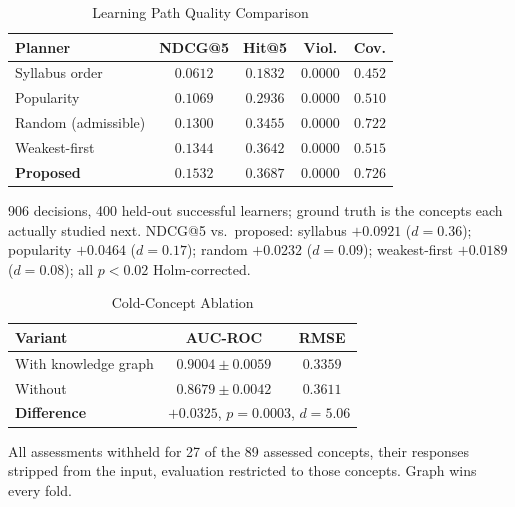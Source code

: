 \begin{table}[t]
\centering
\caption{Learning Path Quality Comparison}
\label{tab:pathquality}
\begin{tabular}{lcccc}
\hline
\textbf{Planner} & \textbf{NDCG@5} & \textbf{Hit@5} & \textbf{Viol.} & \textbf{Cov.} \\
\hline
Syllabus order      & $0.0612$ & $0.1832$ & $0.0000$ & $0.452$ \\
Popularity          & $0.1069$ & $0.2936$ & $0.0000$ & $0.510$ \\
Random (admissible) & $0.1300$ & $0.3455$ & $0.0000$ & $0.722$ \\
Weakest-first       & $0.1344$ & $0.3642$ & $0.0000$ & $0.515$ \\
\textbf{Proposed}   & $\mathbf{0.1532}$ & $\mathbf{0.3687}$ & $\mathbf{0.0000}$ & $\mathbf{0.726}$ \\
\hline
\end{tabular}

\vspace{2pt}
{\footnotesize 906 decisions, 400 held-out successful learners; ground truth is the
concepts each actually studied next. NDCG@5 vs.\ proposed: syllabus $+0.0921$ ($d=0.36$);
popularity $+0.0464$ ($d=0.17$); random $+0.0232$ ($d=0.09$); weakest-first $+0.0189$
($d=0.08$); all $p<0.02$ Holm-corrected.}
\end{table}

\begin{table}[t]
\centering
\caption{Cold-Concept Ablation}
\label{tab:coldconcept}
\begin{tabular}{lcc}
\hline
\textbf{Variant} & \textbf{AUC-ROC} & \textbf{RMSE} \\
\hline
With knowledge graph & $\mathbf{0.9004 \pm 0.0059}$ & $\mathbf{0.3359}$ \\
Without              & $0.8679 \pm 0.0042$ & $0.3611$ \\
\hline
\textbf{Difference}  & \multicolumn{2}{c}{$\mathbf{+0.0325}$, $p = 0.0003$, $d = 5.06$} \\
\hline
\end{tabular}

\vspace{2pt}
{\footnotesize All assessments withheld for 27 of the 89 assessed concepts, their responses
stripped from the input, evaluation restricted to those concepts. Graph wins every fold.}
\end{table}

